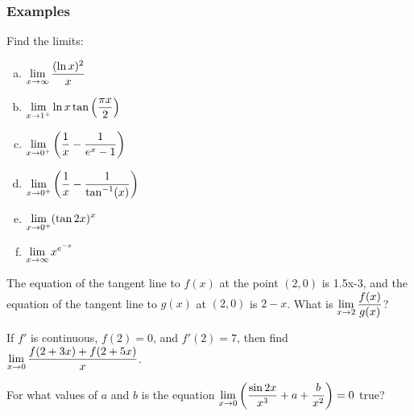 \documentclass[notes]{subfiles}
\begin{document}
	\subsubsection*{Examples}	
		\begin{ex}
			Find the limits:
			\begin{enumerate}[(a)]
				\item $\displaystyle \lim_{x\to \infty} \dfrac{(\ln x)^2}{x}$
					
				\item $\displaystyle \lim_{x\to 1^+} \ln x\tan\left( \dfrac{\pi x}{2}\right)$

				\item $\displaystyle \lim_{x\to 0^+} \left( \dfrac{1}{x} - \dfrac{1}{e^x-1}\right)$
					\newpage
					
				\item $\displaystyle \lim_{x\to 0^+} \left( \dfrac{1}{x} -\dfrac{1}{\tan^{-1}(x)}\right)$
					
				\item $\displaystyle \lim_{x\to 0^+} (\tan 2x)^x$
					
				\item $\displaystyle \lim_{x\to \infty} x^{e^{-x}}$
			\end{enumerate}
		\end{ex}	
			\newpage
			
		\begin{ex}
			The equation of the tangent line to $f(x)$ at the point $(2,0)$ is 1.5x-3, and the equation of the tangent line to $g(x)$ at $(2,0)$ is $2-x$.  What is $\displaystyle \lim_{x\to 2} \dfrac{f(x)}{g(x)}$?  
		\end{ex}
			\vs{1}
			
		\begin{ex}
			If $f'$ is continuous, $f(2) = 0$, and $f'(2) = 7$, then find $\displaystyle \lim_{x\to 0} \dfrac{f(2+3x) + f(2+5x)}{x}$.
		\end{ex}
			\vs{1}
			
		\begin{ex}
			For what values of $a$ and $b$ is the equation $\displaystyle \lim_{x\to 0} \left( \dfrac{\sin 2x}{x^3} + a + \dfrac{b}{x^2}\right) = 0$ true?
		\end{ex}
			\vs{1}
			\newpage
			
\end{document}
